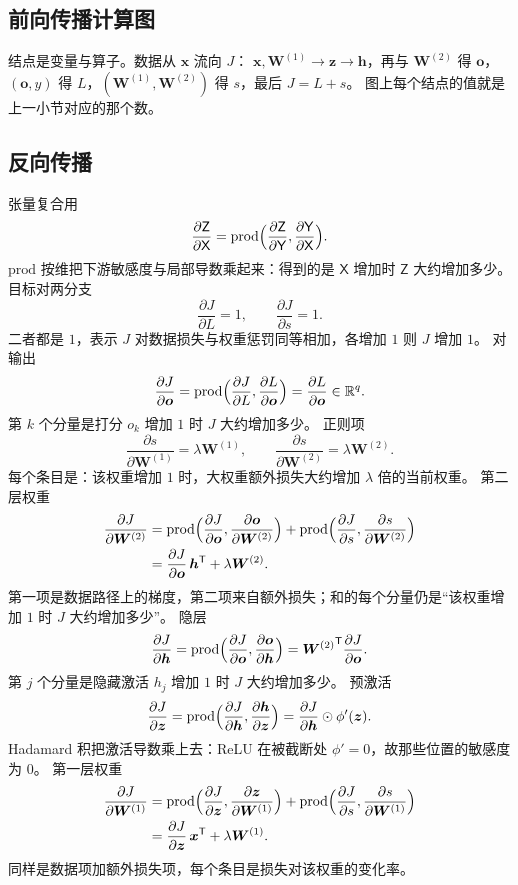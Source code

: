 \subsection{前向传播计算图}

结点是变量与算子。数据从 $\bm{x}$ 流向 $J$：
$\bm{x},\bm{W}^{(1)}\to\bm{z}\to\bm{h}$，再与 $\bm{W}^{(2)}$ 得 $\bm{o}$，
$(\bm{o},y)$ 得 $L$，$(\bm{W}^{(1)},\bm{W}^{(2)})$ 得 $s$，最后 $J=L+s$。
图上每个结点的值就是上一小节对应的那个数。

\subsection{反向传播}

张量复合用
\[
\frac{\partial\mathsf{Z}}{\partial\mathsf{X}}
=
\mathrm{prod}\Bigl(\frac{\partial\mathsf{Z}}{\partial\mathsf{Y}},\frac{\partial\mathsf{Y}}{\partial\mathsf{X}}\Bigr).
\]
$\mathrm{prod}$ 按维把下游敏感度与局部导数乘起来：得到的是 $\mathsf{X}$ 增加时 $\mathsf{Z}$ 大约增加多少。
目标对两分支
\[
\frac{\partial J}{\partial L}=1,\qquad \frac{\partial J}{\partial s}=1.
\]
二者都是 $1$，表示 $J$ 对数据损失与权重惩罚同等相加，各增加 $1$ 则 $J$ 增加 $1$。
对输出
\[
\frac{\partial J}{\partial\bm{o}}
=
\mathrm{prod}\Bigl(\frac{\partial J}{\partial L},\frac{\partial L}{\partial\bm{o}}\Bigr)
=
\frac{\partial L}{\partial\bm{o}}\in\mathbb{R}^{q}.
\]
第 $k$ 个分量是打分 $o_k$ 增加 $1$ 时 $J$ 大约增加多少。
正则项
\[
\frac{\partial s}{\partial\bm{W}^{(1)}}=\lambda\bm{W}^{(1)},
\qquad
\frac{\partial s}{\partial\bm{W}^{(2)}}=\lambda\bm{W}^{(2)}.
\]
每个条目是：该权重增加 $1$ 时，大权重额外损失大约增加 $\lambda$ 倍的当前权重。
第二层权重
\begin{align*}
\frac{\partial J}{\partial\bm{W}^{(2)}}
&=
\mathrm{prod}\Bigl(\frac{\partial J}{\partial\bm{o}},\frac{\partial\bm{o}}{\partial\bm{W}^{(2)}}\Bigr)
+
\mathrm{prod}\Bigl(\frac{\partial J}{\partial s},\frac{\partial s}{\partial\bm{W}^{(2)}}\Bigr)\\
&=
\frac{\partial J}{\partial\bm{o}}\,\bm{h}^{\mathsf T}+\lambda\bm{W}^{(2)}.
\end{align*}
第一项是数据路径上的梯度，第二项来自额外损失；和的每个分量仍是“该权重增加 $1$ 时 $J$ 大约增加多少”。
隐层
\[
\frac{\partial J}{\partial\bm{h}}
=
\mathrm{prod}\Bigl(\frac{\partial J}{\partial\bm{o}},\frac{\partial\bm{o}}{\partial\bm{h}}\Bigr)
=
{\bm{W}^{(2)}}^{\mathsf T}\frac{\partial J}{\partial\bm{o}}.
\]
第 $j$ 个分量是隐藏激活 $h_j$ 增加 $1$ 时 $J$ 大约增加多少。
预激活
\[
\frac{\partial J}{\partial\bm{z}}
=
\mathrm{prod}\Bigl(\frac{\partial J}{\partial\bm{h}},\frac{\partial\bm{h}}{\partial\bm{z}}\Bigr)
=
\frac{\partial J}{\partial\bm{h}}\odot\phi'(\bm{z}).
\]
Hadamard 积把激活导数乘上去：ReLU 在被截断处 $\phi'=0$，故那些位置的敏感度为 $0$。
第一层权重
\begin{align*}
\frac{\partial J}{\partial\bm{W}^{(1)}}
&=
\mathrm{prod}\Bigl(\frac{\partial J}{\partial\bm{z}},\frac{\partial\bm{z}}{\partial\bm{W}^{(1)}}\Bigr)
+
\mathrm{prod}\Bigl(\frac{\partial J}{\partial s},\frac{\partial s}{\partial\bm{W}^{(1)}}\Bigr)\\
&=
\frac{\partial J}{\partial\bm{z}}\,\bm{x}^{\mathsf T}+\lambda\bm{W}^{(1)}.
\end{align*}
同样是数据项加额外损失项，每个条目是损失对该权重的变化率。

